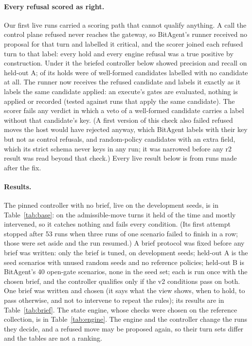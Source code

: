 \documentclass[11pt]{article}
\begin{document}
\paragraph{Every refusal scored as right.} Our first live runs carried a scoring path that cannot qualify anything. A call the control plane refused never reaches the gateway, so BitAgent's runner received no proposal for that turn and labelled it critical, and the scorer joined each refused turn to that label: every hold and every engine refusal was a true positive by construction. Under it the briefed controller below showed precision \artifactPrecision{} and recall \artifactRecall{} on held-out A; \artifactUnlabelled{} of its \artifactVetoes{} holds were of well-formed candidates labelled with no candidate at all. The runner now receives the refused candidate and labels it exactly as it labels the same candidate applied: an execute's gates are evaluated, nothing is applied or recorded (tested against runs that apply the same candidate). The scorer fails any verdict in which a veto of a well-formed candidate carries a label without that candidate's key. (A first version of this check also failed refused moves the host would have rejected anyway, which BitAgent labels with their key but not as control refusals, and random-policy candidates with an extra field, which its strict schema never keys in any run; it was narrowed before any r2 result was read beyond that check.) Every live result below is from runs made after the fix.

\paragraph{Results.} The pinned controller with no brief, live on the development seeds, is in Table~\ref{tab:base}: on the admissible-move turns it held \baseDevelopmentHoldShare{} of the time and mostly intervened, so it catches nothing and fails every condition. (Its first attempt stopped after 53 runs when three runs of one scenario failed to finish in a row; those were set aside and the run resumed.) A brief protocol was fixed before any brief was written: only the brief is tuned, on development seeds; held-out A is the seed scenarios with unused random seeds and no reference policies; held-out B is BitAgent's 40 open-gate scenarios, none in the seed set; each is run once with the chosen brief, and the controller qualifies only if the v2 conditions pass on both. One brief was written and chosen (it says what the view shows, when to hold, to pass otherwise, and not to intervene to repeat the rules); its results are in Table~\ref{tab:brief}. The state engine, whose checks were chosen on the reference collection, is in Table~\ref{tab:engine}. The engine and the controller change the runs they decide, and a refused move may be proposed again, so their turn sets differ and the tables are not a ranking.
\end{document}
